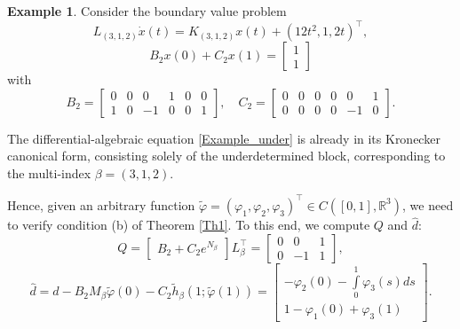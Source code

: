 \documentclass[preprint,12pt]{elsarticle}
\numberwithin{equation}{section}
\theoremstyle{definition}
\newtheorem{example}[theorem]{Example}
\begin{document}
\begin{example}
    Consider the boundary value problem
    \begin{equation}\label{Example_under}
    L_{(3,1,2)}\dot{x}(t)=K_{(3,1,2)} x(t)+\left(
        12t^2, 1, 2t\right)^\top,
\end{equation}
\begin{equation}\label{Example_under_BC}
   B_2x(0)+C_2x(1)=\begin{bmatrix}
        1 \\  1
    \end{bmatrix}
\end{equation}
with
\begin{equation*}
   B_2=\begin{bmatrix}
        0 & 0 & 0 & 1 & 0 & 0\\ 1 & 0 & -1 & 0 & 0 & 1
    \end{bmatrix},\quad C_2=\begin{bmatrix}
        0 & 0 & 0 & 0 & 0 & 1\\ 0 & 0 & 0 & 0 & -1 & 0
    \end{bmatrix}.
\end{equation*}

The differential-algebraic equation \eqref{Example_under} is already in its Kronecker canonical form, consisting solely of the underdetermined block, corresponding to the multi-index $\beta=(3,1,2)$.

Hence, given an arbitrary function $\widetilde{\varphi}=\left(\varphi_1,\varphi_2,\varphi_3\right)^\top\in C([0,1],\mathbb{R}^3)$, we need to verify condition (b) of Theorem \ref{Th1}. To this end, we compute
$Q$ and $\widehat{d}$:
\begin{equation*}\label{Q_ex_UNDET}
    Q=\begin{bmatrix} B_2+C_2e^{N_{\beta}}
\end{bmatrix}L_{\beta}^\top=\begin{bmatrix}
            0&0&1\\0&-1&1
        \end{bmatrix},
\end{equation*}
\begin{equation*}\label{EX-d-Undet}
        \widehat{d}=
d-B_2M_{\beta}\widetilde{\varphi}(0)-C_2 \widetilde{h}_{\beta}(1; \widetilde{\varphi}(1))=\begin{bmatrix}
    -\varphi_2(0)-\int\limits_0^1\varphi_3(s)ds\\1-\varphi_1(0)+\varphi_3(1)\end{bmatrix}.
\end{equation*}


\end{example}
\end{document}
